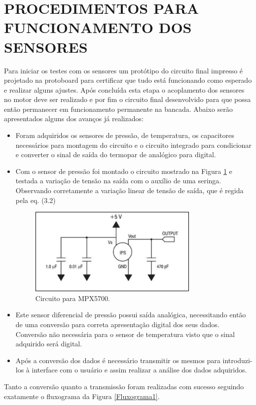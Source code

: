 \section{PROCEDIMENTOS PARA FUNCIONAMENTO DOS SENSORES}
Para iniciar os testes com os sensores um protótipo do circuito final impresso é projetado na protoboard para certificar que tudo está funcionando como esperado e realizar alguns ajustes. Após concluída esta etapa o acoplamento dos sensores no motor deve ser realizado e por fim o circuito final desenvolvido para que possa então permanecer em funcionamento permanente na bancada.
Abaixo serão apresentados alguns dos avanços já realizados:
\begin{itemize}
\item Foram adquiridos os sensores de pressão, de temperatura, os capacitores necessários para montagem do circuito e o circuito integrado para condicionar e converter o sinal de saída do termopar de analógico para digital.
\item Com o sensor de pressão foi montado o circuito mostrado na Figura \ref{Circuitompx} e testada a variação de tensão na saída com o auxílio de uma seringa. Observando corretamente a variação linear de tensão de saída, que é regida pela eq. (3.2)
\begin{figure}[h!]
	\centering
	\includegraphics[keepaspectratio=true,scale= 1.5]{figuras/circuito_mpx.PNG}
	\caption{ Circuito para MPX5700.}
	\label{Circuitompx}
\end{figure}
\item Este sensor diferencial de pressão possui saída analógica, necessitando então de uma conversão para correta apresentação digital dos seus dados. Conversão não necessária para o sensor de temperatura visto que o sinal adquirido será digital.
\item Após a conversão dos dados é necessário transmitir os mesmos para introduzi-los à interface com o usuário e assim realizar a análise dos dados adquiridos.
\end{itemize}
Tanto a conversão quanto a transmissão foram realizadas com sucesso seguindo exatamente o fluxograma da Figura \ref{Fluxograma1}.
